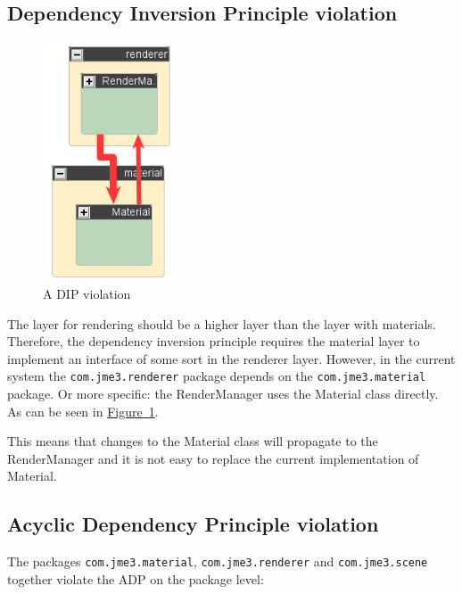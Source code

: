 \documentclass[a4paper, 10pt]{article}
\begin{document}
\subsection{Dependency Inversion Principle violation}
\label{sec:dip_violation}
\begin{figure}
\includegraphics[width=40mm]{figures/dip-violation.png}
\vspace{-15pt}
\caption{A DIP violation}
\label{fig:dip-violation}
\vspace{-60pt}
\end{figure}

The layer for rendering should be a higher layer than the
layer with materials.
Therefore, the dependency inversion principle requires
the material layer to implement an interface of some sort
in the renderer layer.
However, in the current system the \verb|com.jme3.renderer| package 
depends on the \verb|com.jme3.material| package.
Or more specific: the RenderManager uses the Material class directly.
As can be seen in 
\hyperref[fig:dip-violation]{Figure~\ref*{fig:dip-violation}}.

This means that changes to the Material class will propagate
to the RenderManager and it is not easy to replace the current
implementation of Material.

\vspace{45pt}

\subsection{Acyclic Dependency Principle violation}
\label{sec:adp_violation}

The packages \verb|com.jme3.material|, \verb|com.jme3.renderer| and
\verb|com.jme3.scene| together violate the ADP on the package level:
\end{document}
